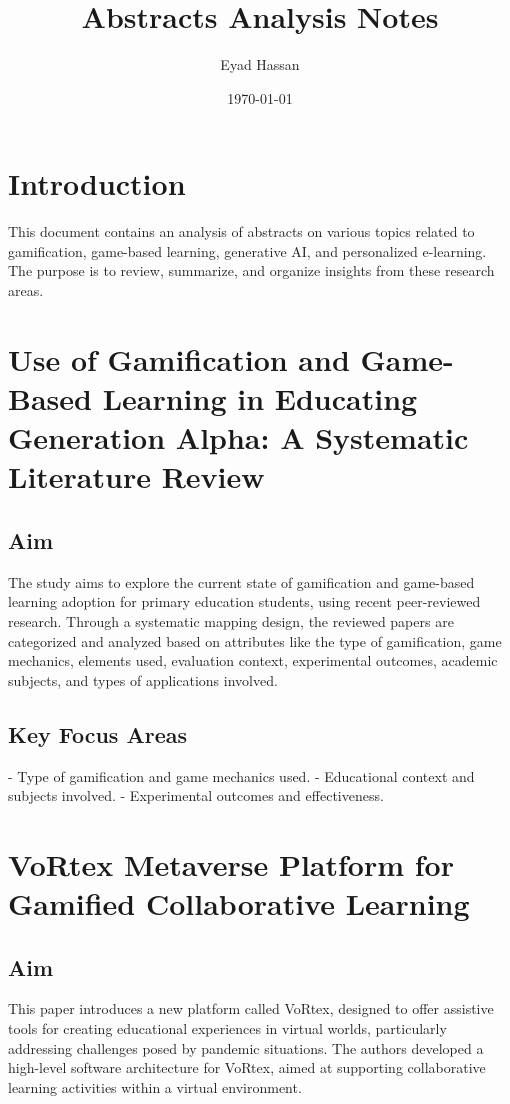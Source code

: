 \documentclass{article}
\title{Abstracts Analysis Notes}
\author{Eyad Hassan}
\date{\today}
\begin{document}
\maketitle

\section{Introduction}
This document contains an analysis of abstracts on various topics related to gamification, game-based learning, generative AI, and personalized e-learning. The purpose is to review, summarize, and organize insights from these research areas.

\newpage
\section{Use of Gamification and Game-Based Learning in Educating Generation Alpha: A Systematic Literature Review}

\subsection{Aim}
The study aims to explore the current state of gamification and game-based learning adoption for primary education students, using recent peer-reviewed research. Through a systematic mapping design, the reviewed papers are categorized and analyzed based on attributes like the type of gamification, game mechanics, elements used, evaluation context, experimental outcomes, academic subjects, and types of applications involved.

\subsection{Key Focus Areas}
- Type of gamification and game mechanics used.
- Educational context and subjects involved.
- Experimental outcomes and effectiveness.

\newpage
\section{VoRtex Metaverse Platform for Gamified Collaborative Learning}

\subsection{Aim}
This paper introduces a new platform called VoRtex, designed to offer assistive tools for creating educational experiences in virtual worlds, particularly addressing challenges posed by pandemic situations. The authors developed a high-level software architecture for VoRtex, aimed at supporting collaborative learning activities within a virtual environment.
\end{document}

